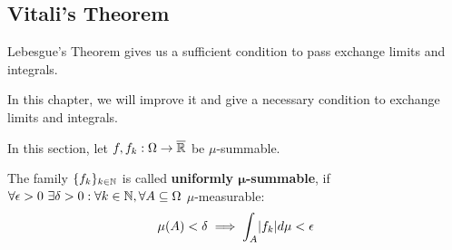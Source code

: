 
\subsection{Vitali's Theorem}
Lebesgue's Theorem gives us a sufficient condition to pass exchange limits and integrals.

In this chapter, we will improve it and give a necessary condition to exchange limits and integrals.

In this section, let $f, f_k: \Omega \to \overline{\mathbb{R}}$ be $\mu$-summable.


\begin{dfn}[]
  The family $\{f_k\}_{k \in \mathbb{N}}$ is called \textbf{uniformly $\bm{\mu}$-summable}, if $\forall \epsilon > 0\ \exists \delta > 0: \forall k \in \N, \forall A \subseteq \Omega$ $\mu$-measurable:
  \begin{align*}
    \mu(A) < \delta \implies \int_{A} \abs{f_k} d \mu < \epsilon
  \end{align*}
\end{dfn}


